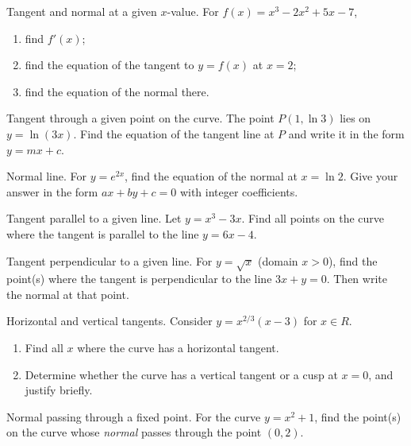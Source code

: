 \documentclass[11pt]{article}
\def\textbf#1{#1}%
\def\mathbb#1{#1}%
\newcounter{question}
\begin{document}

\begin{question}
\textbf{Tangent and normal at a given $x$-value.}
For $f(x)=x^3-2x^2+5x-7$,
\begin{enumerate}
  \item find $f'(x)$;
  \item find the equation of the tangent to $y=f(x)$ at $x=2$;
  \item find the equation of the normal there.
\end{enumerate}
\end{question}

\begin{question}
\textbf{Tangent through a given point on the curve.}
The point $P(1,\ln 3)$ lies on $y=\ln(3x)$. Find the equation of the tangent line at $P$ and write it in the form $y=mx+c$.
\end{question}

\begin{question}
\textbf{Normal line.}
For $y=e^{2x}$, find the equation of the normal at $x=\ln 2$. Give your answer in the form $ax+by+c=0$ with integer coefficients.
\end{question}

\begin{question}
\textbf{Tangent parallel to a given line.}
Let $y=x^3-3x$. Find all points on the curve where the tangent is parallel to the line $y=6x-4$.
\end{question}

\begin{question}
\textbf{Tangent perpendicular to a given line.}
For $y=\sqrt{x}$ (domain $x>0$), find the point(s) where the tangent is perpendicular to the line $3x+y=0$. Then write the normal at that point.
\end{question}

\begin{question}
\textbf{Horizontal and vertical tangents.}
Consider $y=x^{2/3}(x-3)$ for $x\in\mathbb R$.
\begin{enumerate}
  \item Find all $x$ where the curve has a horizontal tangent.
  \item Determine whether the curve has a vertical tangent or a cusp at $x=0$, and justify briefly.
\end{enumerate}
\end{question}

\begin{question}
\textbf{Normal passing through a fixed point.}
For the curve $y=x^2+1$, find the point(s) on the curve whose \emph{normal} passes through the point $(0,2)$.
\end{question}
\end{document}

